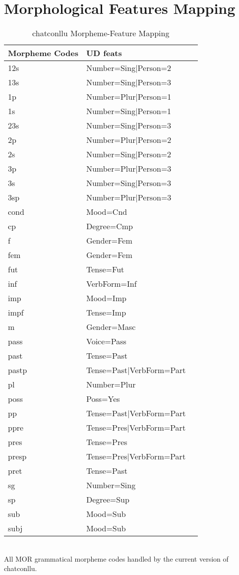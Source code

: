 \newpage
\section{Morphological Features Mapping}
\begin{table}[h!]
\caption {chatconllu Morpheme-Feature Mapping} \label{tab:featsmap}
\centering
\begin{tabularx}{\linewidth}{@{}lXl@{}}
\toprule
\textbf{Morpheme Codes} & \textbf{UD feats}\\ \midrule
	12s & Number=Sing|Person=2\\
	13s & Number=Sing|Person=3\\
	1p & Number=Plur|Person=1\\
	1s & Number=Sing|Person=1\\
	23s & Number=Sing|Person=3\\
	2p & Number=Plur|Person=2\\
	2s & Number=Sing|Person=2\\
	3p & Number=Plur|Person=3\\
	3s & Number=Sing|Person=3\\
	3sp & Number=Plur|Person=3\\
	cond & Mood=Cnd\\
	cp & Degree=Cmp\\
	f & Gender=Fem\\
	fem & Gender=Fem\\
	fut & Tense=Fut\\
	inf & VerbForm=Inf\\
	imp & Mood=Imp\\
	impf & Tense=Imp\\
	m & Gender=Masc\\
	pass & Voice=Pass\\
	past & Tense=Past\\
	pastp & Tense=Past|VerbForm=Part\\
	pl & Number=Plur\\
	poss & Poss=Yes\\
	pp & Tense=Past|VerbForm=Part\\
	ppre & Tense=Pres|VerbForm=Part\\
	pres & Tense=Pres\\
	presp & Tense=Pres|VerbForm=Part\\
	pret & Tense=Past\\
	sg & Number=Sing\\
	sp & Degree=Sup\\
	sub & Mood=Sub\\
	subj & Mood=Sub\\\bottomrule
\end{tabularx}\\
\vspace{0.5cm}
All MOR grammatical morpheme codes handled by the current version of chatconllu.\\
\end{table}


